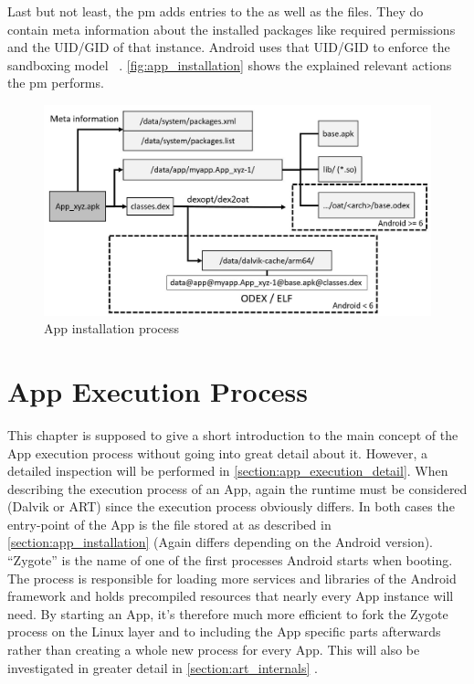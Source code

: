 Last but not least, the pm adds entries to the
 as well as the
 files. They do contain
meta information about the installed packages like
required permissions and the UID/GID of that instance.
Android uses that UID/GID to enforce the sandboxing model
~\parencite[ch.1]{securityinternals}.
\autoref{fig:app_installation} shows the explained
relevant actions the pm performs.

\begin{figure}[htb]
  \includegraphics[width=\textwidth]{figures/app_installation}
  \caption[App installation process]{App installation process}
  \label{fig:app_installation}
\end{figure}

\section{App Execution Process}\label{section:app_execution_simple}
This chapter is supposed to give a short introduction to the
main concept of the App execution process without going into
great detail about it. However, a detailed inspection will
be performed in \autoref{section:app_execution_detail}.
When describing the execution process of an App, again the
runtime must be considered (Dalvik or ART) since the execution process
obviously differs. In both cases the entry-point of the App is the
file stored at  as described in
\autoref{section:app_installation} (Again differs depending on the Android version).
``Zygote'' is
the name of one of the first processes Android starts when booting.
The process is responsible for loading more services and libraries
of the Android framework and holds precompiled resources that
nearly every App instance will need.
By starting an App, it's therefore much more efficient to fork
the Zygote process on the Linux layer and to including the App specific parts afterwards rather than  creating a whole new process for every App.
This will also be investigated in greater detail in \autoref{section:art_internals} \parencite[ch.2]{hackershandbook}.

